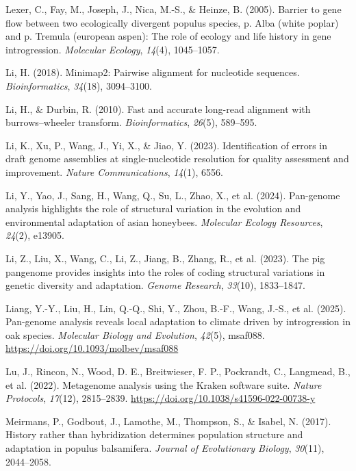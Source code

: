 \documentclass[
]{agujournal2019}
\newlength{\cslhangindent}
\newenvironment{CSLReferences}[2] %
 {\begin{list}{}{%
  \setlength{\itemindent}{0pt}
  \setlength{\leftmargin}{0pt}
  \setlength{\parsep}{0pt}
  \ifodd #1
   \setlength{\leftmargin}{\cslhangindent}
   \setlength{\itemindent}{-1\cslhangindent}
  \fi
  \setlength{\itemsep}{#2\baselineskip}}}
 {\end{list}}
\begin{document}
\begin{CSLReferences}{1}{0}
Lexer, C., Fay, M., Joseph, J., Nica, M.-S., \& Heinze, B. (2005).
Barrier to gene flow between two ecologically divergent populus species,
p. Alba (white poplar) and p. Tremula (european aspen): The role of
ecology and life history in gene introgression. \emph{Molecular
Ecology}, \emph{14}(4), 1045--1057.

Li, H. (2018). Minimap2: Pairwise alignment for nucleotide sequences.
\emph{Bioinformatics}, \emph{34}(18), 3094--3100.

Li, H., \& Durbin, R. (2010). Fast and accurate long-read alignment with
burrows--wheeler transform. \emph{Bioinformatics}, \emph{26}(5),
589--595.

Li, K., Xu, P., Wang, J., Yi, X., \& Jiao, Y. (2023). Identification of
errors in draft genome assemblies at single-nucleotide resolution for
quality assessment and improvement. \emph{Nature Communications},
\emph{14}(1), 6556.

Li, Y., Yao, J., Sang, H., Wang, Q., Su, L., Zhao, X., et al. (2024).
Pan-genome analysis highlights the role of structural variation in the
evolution and environmental adaptation of asian honeybees.
\emph{Molecular Ecology Resources}, \emph{24}(2), e13905.

Li, Z., Liu, X., Wang, C., Li, Z., Jiang, B., Zhang, R., et al. (2023).
The pig pangenome provides insights into the roles of coding structural
variations in genetic diversity and adaptation. \emph{Genome Research},
\emph{33}(10), 1833--1847.

Liang, Y.-Y., Liu, H., Lin, Q.-Q., Shi, Y., Zhou, B.-F., Wang, J.-S., et
al. (2025). Pan-genome analysis reveals local adaptation to climate
driven by introgression in oak species. \emph{Molecular Biology and
Evolution}, \emph{42}(5), msaf088.
\url{https://doi.org/10.1093/molbev/msaf088}

Lu, J., Rincon, N., Wood, D. E., Breitwieser, F. P., Pockrandt, C.,
Langmead, B., et al. (2022). Metagenome analysis using the Kraken
software suite. \emph{Nature Protocols}, \emph{17}(12), 2815--2839.
\url{https://doi.org/10.1038/s41596-022-00738-y}

Meirmans, P., Godbout, J., Lamothe, M., Thompson, S., \& Isabel, N.
(2017). History rather than hybridization determines population
structure and adaptation in populus balsamifera. \emph{Journal of
Evolutionary Biology}, \emph{30}(11), 2044--2058.


\end{CSLReferences}
\end{document}
